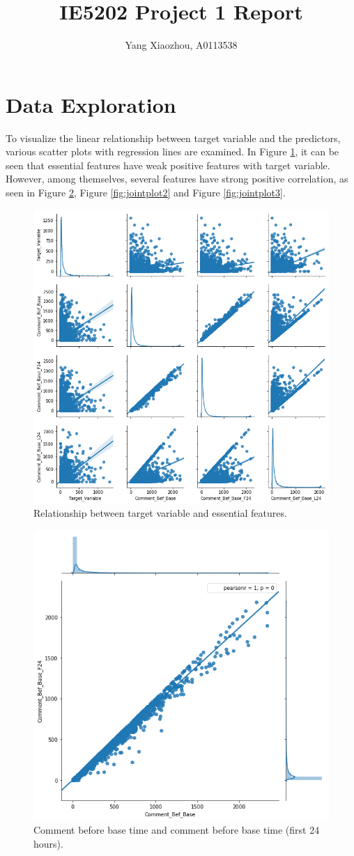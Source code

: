 \documentclass[]{article}
\title{IE5202 Project 1 Report}
\author{Yang Xiaozhou, A0113538}
\begin{document}
\maketitle

\section{Data Exploration}

To visualize the linear relationship between target variable and the predictors, various scatter plots with regression lines are examined. In Figure \ref{fig:pairplot1}, it can be seen that essential features have weak positive features with target variable. However, among themselves, several features have strong positive correlation, as seen in Figure \ref{fig:jointplot1}, Figure \ref{fig:jointplot2} and Figure \ref{fig:jointplot3}.
%
\begin{figure}[hbtp]
	\centering
	\includegraphics[width=0.6\columnwidth]{../Figures/pairplot1}
	\caption{Relationship between target variable and essential features.}
	\label{fig:pairplot1}
\end{figure}
%
%
\begin{figure}[hbtp]
	\centering
	\includegraphics[width=.5\columnwidth]{../Figures/jointplot1}
	\caption{Comment before base time and comment before base time (first 24 hours).}
	\label{fig:jointplot1}
\end{figure}
\end{document}
